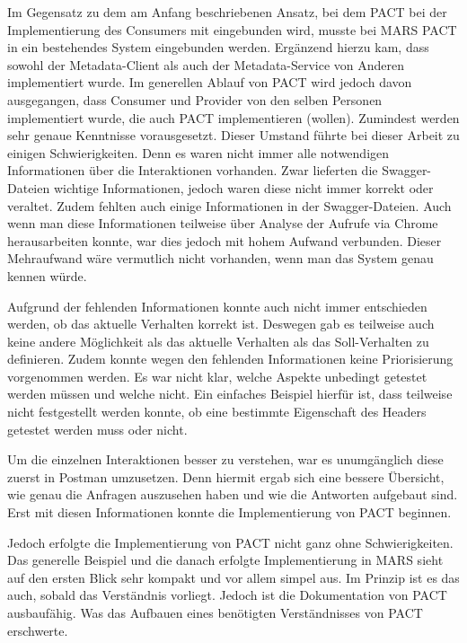 \documentclass{llncs}
\begin{document}
Im Gegensatz zu dem am Anfang beschriebenen Ansatz, bei dem PACT bei der Implementierung des Consumers mit eingebunden wird, musste bei MARS PACT in ein bestehendes System eingebunden werden. Ergänzend hierzu kam, dass sowohl der Metadata-Client als auch der Metadata-Service von Anderen implementiert wurde. Im generellen Ablauf von PACT wird jedoch davon ausgegangen, dass Consumer und Provider von den selben Personen implementiert wurde, die auch PACT implementieren (wollen). Zumindest werden sehr genaue Kenntnisse vorausgesetzt. Dieser Umstand führte bei dieser Arbeit zu einigen Schwierigkeiten.
Denn es waren nicht immer alle notwendigen Informationen über die Interaktionen vorhanden. Zwar lieferten die Swagger-Dateien wichtige Informationen, jedoch waren diese nicht immer korrekt oder veraltet. Zudem fehlten auch einige Informationen in der Swagger-Dateien. Auch wenn man diese Informationen teilweise über Analyse der Aufrufe via Chrome herausarbeiten konnte, war dies jedoch mit hohem Aufwand verbunden. Dieser Mehraufwand wäre vermutlich nicht vorhanden, wenn man das System genau kennen würde.

Aufgrund der fehlenden Informationen konnte auch nicht immer entschieden werden, ob das aktuelle Verhalten korrekt ist. Deswegen gab es teilweise auch keine andere Möglichkeit als das aktuelle Verhalten als das Soll-Verhalten zu definieren. Zudem konnte wegen den fehlenden Informationen keine Priorisierung vorgenommen werden. Es war nicht klar, welche Aspekte unbedingt getestet werden müssen und welche nicht. Ein einfaches Beispiel hierfür ist, dass teilweise nicht festgestellt werden konnte, ob eine bestimmte Eigenschaft des Headers getestet werden muss oder nicht.

Um die einzelnen Interaktionen besser zu verstehen, war es unumgänglich diese zuerst in Postman umzusetzen. Denn hiermit ergab sich eine bessere Übersicht, wie genau die Anfragen auszusehen haben und wie die Antworten aufgebaut sind. Erst mit diesen Informationen konnte die Implementierung von PACT beginnen.

Jedoch erfolgte die Implementierung von PACT nicht ganz ohne Schwierigkeiten. Das generelle Beispiel und die danach erfolgte Implementierung in MARS sieht auf den ersten Blick sehr kompakt und vor allem simpel aus. Im Prinzip ist es das auch, sobald das Verständnis vorliegt. Jedoch ist die Dokumentation von PACT ausbaufähig. Was das Aufbauen eines benötigten Verständnisses von PACT erschwerte.
\end{document}
